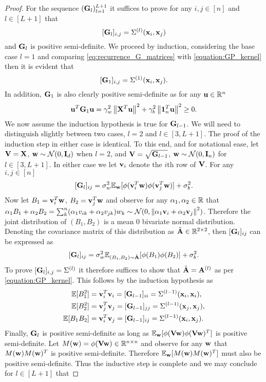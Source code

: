 \begin{proof}
    For the sequence $(\mathbf{G}_l)_{l=1}^{L+1}$ it suffices to prove for any $i,j\in[n]$ and $l \in [L+1]$ that
    \[
    [\mathbf{G}_{l}]_{i,j} = \Sigma^{(l)}(\mathbf x_i, \mathbf x_j)
    \]
    and $\mathbf{G}_{l}$ is positive semi-definite.  We proceed by induction, considering the base case $l=1$ and comparing \eqref{eq:recurrence_G_matrices} with \eqref{equation:GP_kernel} then it is evident that
    \[
    [\mathbf{G}_{1}]_{i,j} = \Sigma^{(1)}(\mathbf x_i, \mathbf x_j).
    \]
    In addition, $\mathbf{G}_{1}$ is also clearly positive semi-definite as for any $\mathbf u \in \mathbb{R}^n$
    \[
    \mathbf u^T\mathbf{G}_{1}\mathbf u = \gamma_w^2\left\lVert\mathbf{X}^T\mathbf u\right\rVert^2 + \gamma_b^2\left\lVert\textbf{1}_n^T \mathbf u\right\rVert^2 \geq 0.
    \]
    We now assume the induction hypothesis is true for $\mathbf{G}_{l-1}$. We will need to distinguish slightly between two cases, $l=2$ and $l\in[3,L+1]$. The proof of the induction step in either case is identical. To this end, and for notational ease, let $\mathbf{V} = \mathbf{X}$, $\mathbf w \sim \mathcal{N}(0, \textbf{I}_d)$ when $l=2$, and $\mathbf{V} = \sqrt{\mathbf{G}_{l-1}}$, $\mathbf w \sim \mathcal{N}(0, \textbf{I}_n)$ for $l\in[3,L+1]$. In either case we let $\mathbf v_i$ denote the $i$th row of $\mathbf{V}$. For any $i,j \in [n]$
    \[
    [\mathbf{G}_{l}]_{ij} = \sigma_w^2 \mathbb{E}_{\mathbf w}[\phi(\mathbf v_i^T \mathbf w)\phi(\mathbf v_j^T\mathbf w)] + \sigma_b^2.
    \]
    Now let $B_1 = \mathbf v_i^T \mathbf w$, $B_2 =\mathbf v_j^T \mathbf w$ and observe for any $\alpha_1, \alpha_2 \in \mathbb{R}$ that $\alpha_1B_1 + \alpha_2B_2 = \sum_{k}^n(\alpha_1v_{ik}+ \alpha_2v_{jk})w_{k} \sim \mathcal{N}(0, \left\lVert\alpha_1 \mathbf v_i + \alpha_2 \mathbf v_j\right\rVert^2)$. Therefore the joint distribution of $(B_1, B_2)$ is a mean 0 bivariate normal distribution. Denoting the covariance matrix of this distribution as $\tilde{\mathbf{A}} \in \mathbb{R}^{2 \times 2}$, then $[\mathbf{G}_{l}]_{ij}$ can be expressed as
    \[
    [\mathbf{G}_{l}]_{ij} = \sigma_w^2 \mathbb{E}_{(B_1, B_2)\sim \tilde{\mathbf{A}}}[\phi(B_1) \phi(B_2)] + \sigma_b^2.
    \]
    To prove $[\mathbf{G}_{l}]_{i,j} = \Sigma^{(l)}$ it therefore suffices to show that $\tilde{\mathbf{A}} = \mathbf{A}^{(l)}$ as per \eqref{equation:GP_kernel}. This follows by the induction hypothesis as
    \[
    \begin{aligned}
    \mathbb{E}[B_1^2] &= \mathbf v_i^T \mathbf v_i = [\mathbf{G}_{l-1}]_{ii} = \Sigma^{(l-1)}(\mathbf x_i, \mathbf x_i),\\
    \mathbb{E}[B_2^2] &= \mathbf v_j^T \mathbf v_j = [\mathbf{G}_{l-1}]_{jj} = \Sigma^{(l-1)}(\mathbf x_j, \mathbf x_j),\\
    \mathbb{E}[B_1B_2] &= \mathbf v_i^T \mathbf v_j = [\mathbf{G}_{l-1}]_{ij} = \Sigma^{(l-1)}(\mathbf x_i, \mathbf x_j).
    \end{aligned}
    \]
    Finally, $\mathbf{G}_{l}$ is positive semi-definite as long as $\mathbb{E}_{\mathbf w}[\phi(\mathbf{V} \mathbf w) \phi(\mathbf{V} \mathbf w)^T]$ is positive semi-definite. Let $M(\mathbf w) = \phi(\mathbf{V} \mathbf w) \in \mathbb{R}^{n\times n}$ and observe for any $\mathbf w$ that $M(\mathbf w)M(\mathbf w)^T$ is positive semi-definite. Therefore $\mathbb{E}_{\mathbf w}[M(\mathbf w)M(\mathbf w)^T]$ must also be positive semi-definite. Thus the inductive step is complete and we may conclude for $l \in [L+1]$ that

\end{proof}
